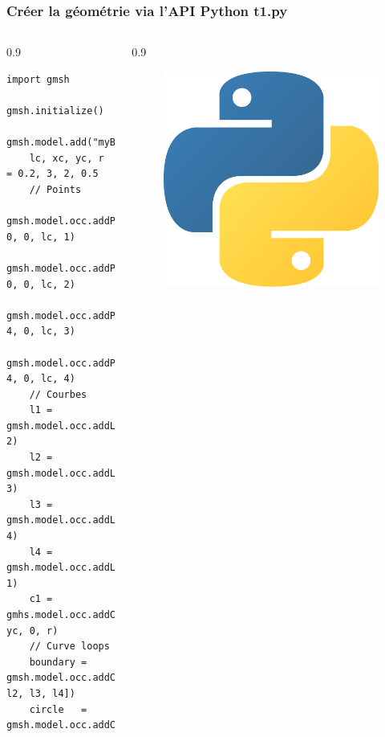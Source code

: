 \documentclass[aspectratio=169]{beamer}
\begin{document}
\begin{frame}[fragile]
\frametitle{Créer la géométrie via l'API Python \hfill t1.py}
  \footnotesize
  \begin{columns}
    \begin{column}{0.9\linewidth}
    \begin{lstlisting}[frame=none, aboveskip=-0.5mm]
    import gmsh
    gmsh.initialize()
    gmsh.model.add("myBeautifulModel")
    lc, xc, yc, r = 0.2, 3, 2, 0.5
    // Points
    gmsh.model.occ.addPoint(0, 0, 0, lc, 1)
    gmsh.model.occ.addPoint(10, 0, 0, lc, 2)
    gmsh.model.occ.addPoint(10, 4, 0, lc, 3)
    gmsh.model.occ.addPoint(0, 4, 0, lc, 4)
    // Courbes
    l1 = gmsh.model.occ.addLine(1, 2)
    l2 = gmsh.model.occ.addLine(2, 3)
    l3 = gmsh.model.occ.addLine(3, 4)
    l4 = gmsh.model.occ.addLine(4, 1)
    c1 = gmhs.model.occ.addCircle(xc, yc, 0, r)
    // Curve loops
    boundary = gmsh.model.occ.addCurveLoop([l1, l2, l3, l4])
    circle   = gmsh.model.occ.addCurveLoop([c1])
    \end{lstlisting}
    \end{column}
    \begin{column}{0.9\linewidth}
      \begin{figure}
        \vspace{-5.5cm}
        \hspace{-8cm}
        \includegraphics[width=0.1\linewidth]{figures/py.png}
        \caption{}
        \label{}
      \end{figure}
    \end{column}
  \end{columns}
\end{frame}
\end{document}
